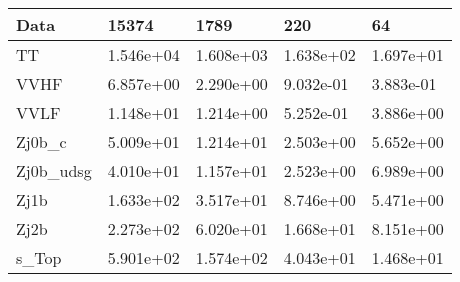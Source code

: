 \begin{table}
{\begin{tabularx}{\textwidth}{|X|X|X|X|X|}
\hline
Data & 15374 & 1789 & 220 & 64 \\
\hline
TT & 1.546e+04 & 1.608e+03 & 1.638e+02 & 1.697e+01 \\
VVHF & 6.857e+00 & 2.290e+00 & 9.032e-01 & 3.883e-01 \\
VVLF & 1.148e+01 & 1.214e+00 & 5.252e-01 & 3.886e+00 \\
Zj0b\_c & 5.009e+01 & 1.214e+01 & 2.503e+00 & 5.652e+00 \\
Zj0b\_udsg & 4.010e+01 & 1.157e+01 & 2.523e+00 & 6.989e+00 \\
Zj1b & 1.633e+02 & 3.517e+01 & 8.746e+00 & 5.471e+00 \\
Zj2b & 2.273e+02 & 6.020e+01 & 1.668e+01 & 8.151e+00 \\
s\_Top & 5.901e+02 & 1.574e+02 & 4.043e+01 & 1.468e+01 \\
\hline
\end{tabularx}
}
\label{tab:cr-Zee-2017}
\end{table}

